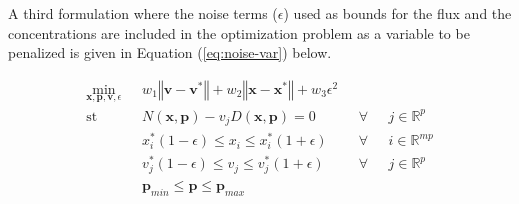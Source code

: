 \documentclass[10pt]{report}
\begin{document}
	A third formulation where the noise terms ($\epsilon$) used as bounds for the flux and the concentrations are included in the optimization problem as a variable to be penalized is given in Equation (\ref{eq:noise-var}) below.
	
	\begin{center}
		\begin{subequations}\label{eq:noise-var}
			\begin{align}
			\underset{\mathbf{x},\mathbf{p},\mathbf{v},\epsilon}{\mathrm{min}} & \text{      }w_1\left\Vert \mathbf{v}-\mathbf{v}^*\right\Vert + w_2\left\Vert \mathbf{x}-\mathbf{x}^*\right\Vert + w_3\epsilon^2\\
			\mathrm{st}& \text{      }N(\mathbf{x},\mathbf{p}) - v_jD(\mathbf{x},\mathbf{p}) = 0 & \text{  }\forall & \text{ }j\in\mathbb{R}^p\\
			& \text{      }x^*_i(1-\epsilon)\le x_i \le x^*_i(1+\epsilon) & \text{  }\forall & \text{ }i\in\mathbb{R}^{mp}\\	
			& \text{      }v^*_j(1-\epsilon)\le v_j \le v^*_j(1+\epsilon) & \text{  }\forall & \text{ }j\in\mathbb{R}^{p}\\		
			& \text{      }\mathbf{p}_{min} \le \mathbf{p} \le \mathbf{p}_{max}
			\end{align}
		\end{subequations}
	\end{center}


	
	
	
\end{document}
